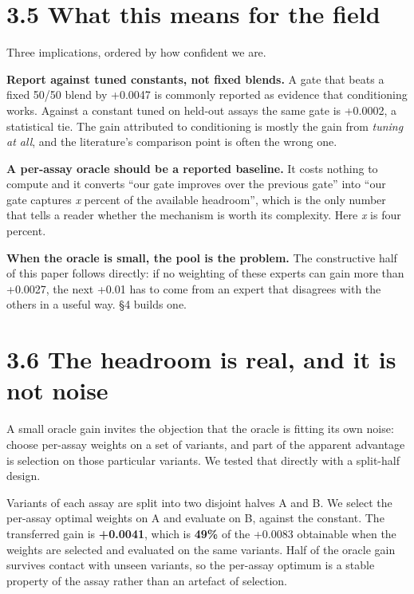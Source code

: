 \documentclass[sigconf,review,nonacm]{acmart}
\begin{document}
\hypertarget{what-this-means-for-the-field}{%
\section{3.5 What this means for the field}\label{what-this-means-for-the-field}}

Three implications, ordered by how confident we are.

\textbf{Report against tuned constants, not fixed blends.} A gate that beats a fixed 50/50 blend by +0.0047
is commonly reported as evidence that conditioning works. Against a constant tuned on held-out assays
the same gate is +0.0002, a statistical tie. The gain attributed to conditioning is mostly the gain from
\emph{tuning at all}, and the literature's comparison point is often the wrong one.

\textbf{A per-assay oracle should be a reported baseline.} It costs nothing to compute and it converts ``our
gate improves over the previous gate'' into ``our gate captures \emph{x} percent of the available headroom'',
which is the only number that tells a reader whether the mechanism is worth its complexity. Here \emph{x} is
four percent.

\textbf{When the oracle is small, the pool is the problem.} The constructive half of this paper follows
directly: if no weighting of these experts can gain more than +0.0027, the next +0.01 has to come from
an expert that disagrees with the others in a useful way. §4 builds one.

\hypertarget{the-headroom-is-real-and-it-is-not-noise}{%
\section{3.6 The headroom is real, and it is not noise}\label{the-headroom-is-real-and-it-is-not-noise}}

A small oracle gain invites the objection that the oracle is fitting its own noise: choose per-assay
weights on a set of variants, and part of the apparent advantage is selection on those particular
variants. We tested that directly with a split-half design.

Variants of each assay are split into two disjoint halves A and B. We select the per-assay optimal
weights on A and evaluate on B, against the constant. The transferred gain is \textbf{+0.0041}, which is
\textbf{49\%} of the +0.0083 obtainable when the weights are selected and evaluated on the same variants.
Half of the oracle gain survives contact with unseen variants, so the per-assay optimum is a stable
property of the assay rather than an artefact of selection.
\end{document}
